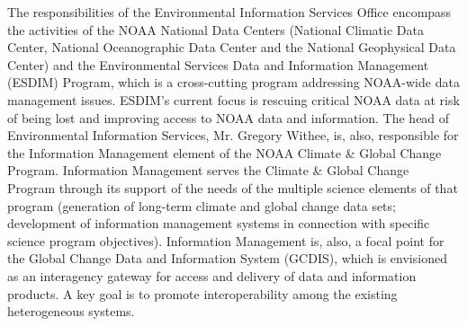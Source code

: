 \medskip
\large
{}
\normalsize
\medskip

	The responsibilities of the Environmental Information Services 
Office encompass the activities of the NOAA National Data Centers 
(National Climatic Data Center, National Oceanographic Data Center and 
the National Geophysical Data Center) and the Environmental Services Data 
and Information Management (ESDIM) Program, which is a cross-cutting 
program addressing NOAA-wide data management issues.  ESDIM's current 
focus is rescuing critical NOAA data at risk of being lost and improving 
access to NOAA data and information.  The head of Environmental 
Information Services, Mr. Gregory Withee, is, also, responsible for the 
Information Management element of the NOAA Climate \& Global Change 
Program.  Information Management serves the Climate \& Global Change 
Program through its support of the needs of the multiple science elements 
of that program (generation of long-term climate and global change data 
sets; development of information management systems in connection with 
specific science program objectives).  Information Management is, also, a 
focal point for the Global Change Data and Information System (GCDIS), 
which is envisioned as an interagency gateway for access and delivery of 
data and information products.  A key goal is to promote interoperability 
among the existing heterogeneous systems.
\newpage

